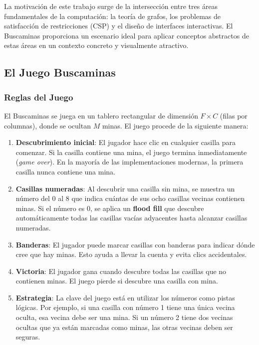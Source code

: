 \documentclass[12pt,a4paper]{article}
\begin{document}
La motivación de este trabajo surge de la intersección entre tres áreas fundamentales de la computación: la teoría de grafos, los problemas de satisfacción de restricciones (CSP) y el diseño de interfaces interactivas. El Buscaminas proporciona un escenario ideal para aplicar conceptos abstractos de estas áreas en un contexto concreto y visualmente atractivo.

\subsection{El Juego Buscaminas}

\subsubsection{Reglas del Juego}

El Buscaminas se juega en un tablero rectangular de dimensión $F \times C$ (filas por columnas), donde se ocultan $M$ minas. El juego procede de la siguiente manera:

\begin{enumerate}[itemsep=2pt]
    \item \textbf{Descubrimiento inicial}: El jugador hace clic en cualquier casilla para comenzar. Si la casilla contiene una mina, el juego termina inmediatamente (\textit{game over}). En la mayoría de las implementaciones modernas, la primera casilla nunca contiene una mina.

    \item \textbf{Casillas numeradas}: Al descubrir una casilla sin mina, se muestra un número del 0 al 8 que indica cuántas de sus ocho casillas vecinas contienen minas. Si el número es 0, se aplica un \textbf{flood fill} que descubre automáticamente todas las casillas vacías adyacentes hasta alcanzar casillas numeradas.

    \item \textbf{Banderas}: El jugador puede marcar casillas con banderas para indicar dónde cree que hay minas. Esto ayuda a llevar la cuenta y evita clics accidentales.

    \item \textbf{Victoria}: El jugador gana cuando descubre todas las casillas que no contienen minas. El juego pierde si descubre una casilla con mina.

    \item \textbf{Estrategia}: La clave del juego está en utilizar los números como pistas lógicas. Por ejemplo, si una casilla con número 1 tiene una única vecina oculta, esa vecina debe ser una mina. Si un número 2 tiene dos vecinas ocultas que ya están marcadas como minas, las otras vecinas deben ser seguras.
\end{enumerate}
\end{document}
